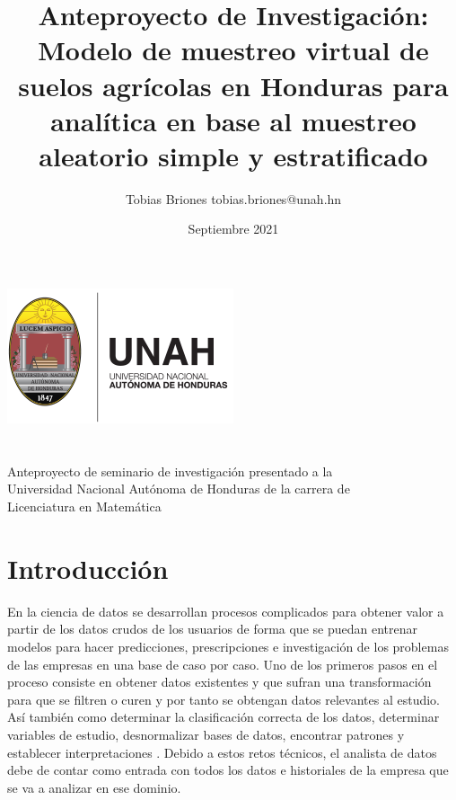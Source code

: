 \documentclass{report}
\title{Anteproyecto de Investigación: Modelo de muestreo virtual de suelos agrícolas en Honduras para analítica en base al muestreo aleatorio simple y estratificado}
\author{Tobias Briones \bigbreak tobias.briones@unah.hn}
\date{Septiembre 2021}
\begin{document}
\makeatletter
    \begin{titlepage}
        \begin{center}
            \includegraphics[width=0.3\linewidth]{ref/logo-unah.png}\\[4ex]
            {\huge \bfseries \@title 
            \vspace{1cm}}\\[2ex]
            {\LARGE \@author}\\[50ex] 
            
            {\large
            Anteproyecto de seminario de investigación presentado a la\\
            Universidad Nacional Autónoma de Honduras de la carrera de\\
            Licenciatura en Matemática
            }\\[2ex]
            
            {\large \@date}
        \end{center}
    \end{titlepage}
\makeatother
\thispagestyle{empty}
\newpage

\thispagestyle{empty}
\tableofcontents
\listoffigures
\newpage


\chapter{Introducción}

En la ciencia de datos se desarrollan procesos complicados para obtener valor a partir de los datos crudos de los usuarios de forma que se puedan entrenar modelos para hacer predicciones, prescripciones e investigación de los problemas de las empresas en una base de caso por caso. Uno de los primeros pasos en el proceso consiste en obtener datos existentes y que sufran una transformación para que se filtren o curen y por tanto se obtengan datos relevantes al estudio. Así también como determinar la clasificación correcta de los datos, determinar variables de estudio, desnormalizar bases de datos, encontrar patrones y establecer  interpretaciones \cite{university-of-wisconsin-data-science-2021}. Debido a estos retos técnicos, el analista de datos debe de contar como entrada con todos los datos e historiales de la empresa que se va a analizar en ese dominio.
\end{document}
